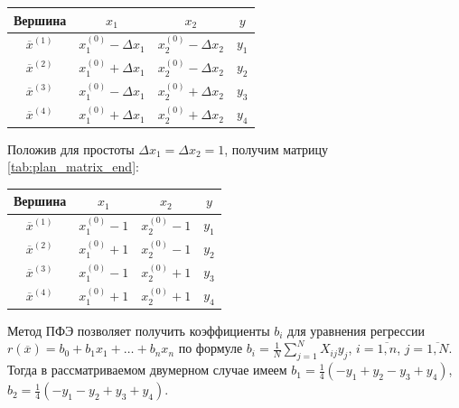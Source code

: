 \documentclass[a4paper,12pt]{report}
\begin{document}
\begin{center}
  \captionsetup{justification=raggedleft}
  \label{tab:plan_matrix_nat}
  \begin{tabular}{|c|c|c|c|}
    \hline
    Вершина & $x_{1}$ & $x_{2}$ & $y$\\
    \hline
    $\overline{x}^{(1)}$ & $x^{(0)}_{1}-\Delta x_{1}$ & $x^{(0)}_{2}-\Delta x_{2}$ & $y_{1}$\\
    \hline
    $\overline{x}^{(2)}$ & $x^{(0)}_{1}+\Delta x_{1}$ & $x^{(0)}_{2}-\Delta x_{2}$ & $y_{2}$\\
    \hline
    $\overline{x}^{(3)}$ & $x^{(0)}_{1}-\Delta x_{1}$ & $x^{(0)}_{2}+\Delta x_{2}$ & $y_{3}$\\
    \hline
    $\overline{x}^{(4)}$ & $x^{(0)}_{1}+\Delta x_{1}$ & $x^{(0)}_{2}+\Delta x_{2}$ & $y_{4}$\\
    \hline
  \end{tabular}
\end{center}

Положив для простоты $\Delta x_{1} = \Delta x_{2} = 1$, получим матрицу \ref{tab:plan_matrix_end}:

\begin{center}
  \captionsetup{justification=raggedleft}
  \label{tab:plan_matrix_end}
  \begin{tabular}{|c|c|c|c|}
    \hline
    Вершина & $x_{1}$ & $x_{2}$ & $y$\\
    \hline
    $\overline{x}^{(1)}$ & $x^{(0)}_{1}-1$ & $x^{(0)}_{2}-1$ & $y_{1}$\\
    \hline
    $\overline{x}^{(2)}$ & $x^{(0)}_{1}+1$ & $x^{(0)}_{2}-1$ & $y_{2}$\\
    \hline
    $\overline{x}^{(3)}$ & $x^{(0)}_{1}-1$ & $x^{(0)}_{2}+1$ & $y_{3}$\\
    \hline
    $\overline{x}^{(4)}$ & $x^{(0)}_{1}+1$ & $x^{(0)}_{2}+1$ & $y_{4}$\\
    \hline
  \end{tabular}
\end{center}

Метод ПФЭ позволяет получить коэффициенты $b_{i}$ для уравнения регрессии $r(\overline{x}) = b_{0} + b_{1}x_{1} + \ldots + b_{n}x_{n}$ по формуле $b_{i} = \frac{1}{N}\sum\limits_{j=1}^N X_{ij}y_{j}$, $i=\overline{1,n}$, $j=\overline{1,N}$. Тогда в рассматриваемом двумерном случае имеем $b_{1} = \frac{1}{4}\left(-y_{1}+y_{2}-y_{3}+y_{4}\right)$, $b_{2} = \frac{1}{4}\left(-y_{1}-y_{2}+y_{3}+y_{4}\right)$.
\end{document}
